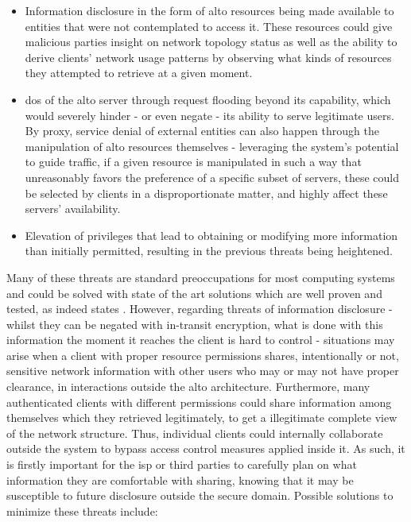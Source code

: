 \begin{itemize}
    \item Information disclosure in the form of \gls{alto} resources being made available to entities that were not contemplated to access it.
            These resources could give malicious parties insight on network topology status as well as the ability to derive clients' network usage patterns by observing what kinds of resources they attempted to retrieve at a given moment.
    \item \gls{dos} of the \gls{alto} server through request flooding beyond its capability, which would severely hinder - or even negate - its ability to serve legitimate users.
        By proxy, service denial of external entities can also happen through the manipulation of \gls{alto} resources themselves - leveraging the system's potential to guide traffic, if a given resource is manipulated in such a way that unreasonably favors the preference of a specific subset of servers, these could be selected by clients in a disproportionate matter, and highly affect these servers' availability.
    \item Elevation of privileges that lead to obtaining or modifying more information than initially permitted, resulting in the previous threats being heightened.
\end{itemize}

    Many of these threats are standard preoccupations for most computing systems and could be solved with state of the art solutions which are well proven and tested, as indeed states \cite{alto-protocol}.
    However, regarding threats of information disclosure - whilst they can be negated with in-transit encryption, what is done with this information the moment it reaches the client is hard to control - situations may arise when a client with proper resource permissions shares, intentionally or not, sensitive network information with other users who may or may not have proper clearance, in interactions outside the \gls{alto} architecture.
    Furthermore, many authenticated clients with different permissions could share information among themselves which they retrieved legitimately, to get a illegitimate complete view of the network structure.
    Thus, individual clients could internally collaborate outside the system to bypass access control measures applied inside it.
    As such, it is firstly important for the \gls{isp} or third parties to carefully plan on what information they are comfortable with sharing, knowing that it may be susceptible to future disclosure outside the secure domain.
    Possible solutions to minimize these threats include:

